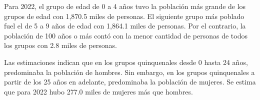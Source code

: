 \justifying Para 2022, el grupo de edad de 0 a 4 años tuvo la población más grande de los grupos de edad con 1,870.5 miles de personas. El siguiente grupo más poblado fuel el de 5 a 9 años de edad con 1,864.1 miles de personas. Por el contrario,  la población de 100 años o más contó con la menor cantidad de personas de todos los grupos con 2.8 miles de personas. 

Las estimaciones indican que en los grupos quinquenales desde 0 hasta 24 años, predominaba la población de hombres. Sin embargo, en los grupos quinquenales a partir de los 25 años en adelante, predominaba la población de mujeres. Se estima que para 2022 hubo 277.0 miles de mujeres más que hombres.
